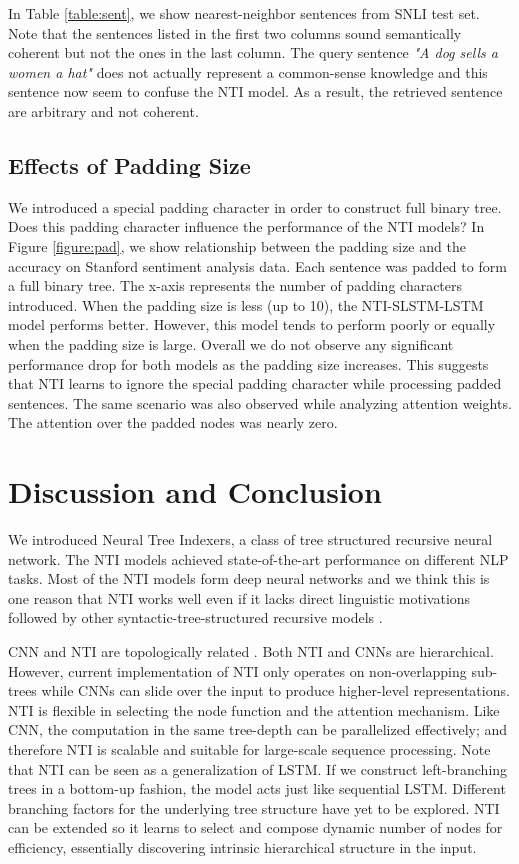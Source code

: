 \documentclass[11pt]{article}
\begin{document}
In Table \ref{table:sent}, we show nearest-neighbor sentences from SNLI test set. Note that the sentences listed in the first two columns sound semantically coherent but not the ones in the last column. The query sentence \textit{"A dog sells a women a hat"} does not actually represent a common-sense knowledge and this sentence now seem to confuse the NTI model. As a result, the retrieved sentence are arbitrary and not coherent.

\subsection{Effects of Padding Size}
\label{sup:pad}

We introduced a special padding character in order to construct full binary tree. Does this padding character influence the performance of the NTI models? In Figure \ref{figure:pad}, we show relationship between the padding size and the accuracy on Stanford sentiment analysis data. Each sentence was padded to form a full binary tree. The x-axis represents the number of padding characters introduced. When the padding size is less (up to 10), the NTI-SLSTM-LSTM model performs better. However, this model tends to perform poorly or equally when the padding size is large. Overall we do not observe any significant performance drop for both models as the padding size increases. This suggests that NTI learns to ignore the special padding character while processing padded sentences. The same scenario was also observed while analyzing attention weights. The attention over the padded nodes was nearly zero.

\section{Discussion and Conclusion}
We introduced Neural Tree Indexers, a class of tree structured recursive neural network. The NTI models achieved state-of-the-art performance on different NLP tasks. 
Most of the NTI models form deep neural networks and we think this is one reason that NTI works well even if it lacks direct linguistic motivations followed by other syntactic-tree-structured recursive models \cite{socher2013recursive}. 


CNN and NTI are topologically related \cite{nal2013}. Both NTI and CNNs are hierarchical. However, current implementation of NTI only operates on non-overlapping sub-trees while CNNs can slide over the input to produce higher-level representations. 
NTI is flexible in selecting the node function and the attention mechanism. Like CNN, the computation in the same tree-depth can be parallelized effectively; and therefore NTI is scalable and suitable for large-scale sequence processing.
Note that NTI can be seen as a generalization of LSTM. If we construct left-branching trees in a bottom-up fashion, the model acts just like sequential LSTM. 
Different branching factors for the underlying tree structure have yet to be explored. NTI can be extended so it learns to select and compose dynamic number of nodes for efficiency, essentially discovering intrinsic hierarchical structure in the input.  
\end{document}
